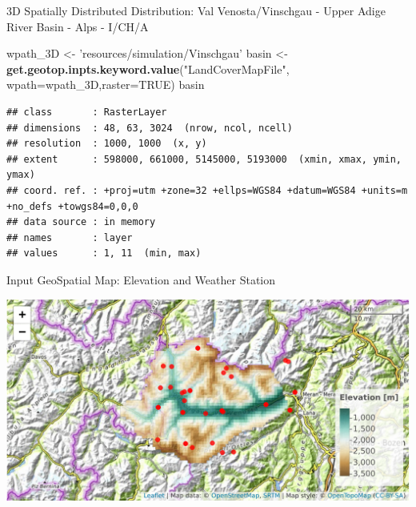 \documentclass[ignorenonframetext,]{beamer}
\newenvironment{Shaded}{\begin{snugshade}}{\end{snugshade}}
\newcommand{\KeywordTok}[1]{\textcolor[rgb]{0.13,0.29,0.53}{\textbf{#1}}}
\newcommand{\DataTypeTok}[1]{\textcolor[rgb]{0.13,0.29,0.53}{#1}}
\newcommand{\StringTok}[1]{\textcolor[rgb]{0.31,0.60,0.02}{#1}}
\newcommand{\OtherTok}[1]{\textcolor[rgb]{0.56,0.35,0.01}{#1}}
\newcommand{\NormalTok}[1]{#1}
\begin{document}
\begin{frame}[fragile]{3D Spatially Distributed Distribution: Val
Venosta/Vinschgau - Upper Adige River Basin - Alps - I/CH/A}

\begin{Shaded}
\begin{Highlighting}[]
\NormalTok{wpath_3D <-}\StringTok{ 'resources/simulation/Vinschgau'}
\NormalTok{basin <-}\StringTok{ }\KeywordTok{get.geotop.inpts.keyword.value}\NormalTok{(}\StringTok{"LandCoverMapFile"}\NormalTok{,}
              \DataTypeTok{wpath=}\NormalTok{wpath_3D,}\DataTypeTok{raster=}\OtherTok{TRUE}\NormalTok{)}
\NormalTok{basin}
\end{Highlighting}
\end{Shaded}

\begin{verbatim}
## class       : RasterLayer 
## dimensions  : 48, 63, 3024  (nrow, ncol, ncell)
## resolution  : 1000, 1000  (x, y)
## extent      : 598000, 661000, 5145000, 5193000  (xmin, xmax, ymin, ymax)
## coord. ref. : +proj=utm +zone=32 +ellps=WGS84 +datum=WGS84 +units=m +no_defs +towgs84=0,0,0 
## data source : in memory
## names       : layer 
## values      : 1, 11  (min, max)
\end{verbatim}

\end{frame}

\begin{frame}{Input GeoSpatial Map: Elevation and Weather Station}

\includegraphics{presentation_files/figure-beamer/unnamed-chunk-12-1.pdf}

\end{frame}
\end{document}
